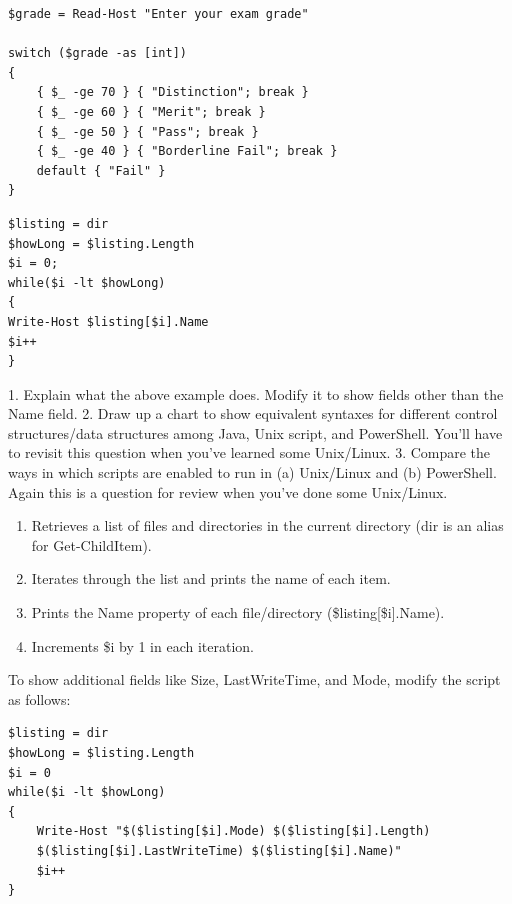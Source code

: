 \documentclass[a4paper]{article}
\begin{document}
\begin{verbatim}
$grade = Read-Host "Enter your exam grade"

switch ($grade -as [int])  
{
    { $_ -ge 70 } { "Distinction"; break }
    { $_ -ge 60 } { "Merit"; break }
    { $_ -ge 50 } { "Pass"; break }
    { $_ -ge 40 } { "Borderline Fail"; break }
    default { "Fail" }
}
\end{verbatim}
\begin{verbatim}
$listing = dir
$howLong = $listing.Length
$i = 0;
while($i -lt $howLong)
{
Write-Host $listing[$i].Name
$i++
}
\end{verbatim}
\textcolor{green!50!black}{
    1. Explain what the above example does. Modify it to show fields other
    than the Name field.
    2. Draw up a chart to show equivalent syntaxes for different control
    structures/data structures among Java, Unix script, and PowerShell. You'll have to
    revisit this question when you've learned some Unix/Linux.
    3. Compare the ways in which scripts are enabled to run in (a)
    Unix/Linux and (b) PowerShell. Again this is a question for review when you've
    done some Unix/Linux.
}
\begin{enumerate}
    \item Retrieves a list of files and directories in the current directory (dir is an alias for Get-ChildItem).
    \item Iterates through the list and prints the name of each item.
    \item Prints the Name property of each file/directory (\$listing[\$i].Name).
    \item Increments \$i by 1 in each iteration.
\end{enumerate}
To show additional fields like Size, LastWriteTime, and Mode, modify the script as follows:
\begin{verbatim}
$listing = dir
$howLong = $listing.Length
$i = 0
while($i -lt $howLong)
{
    Write-Host "$($listing[$i].Mode) $($listing[$i].Length) 
    $($listing[$i].LastWriteTime) $($listing[$i].Name)"
    $i++
}
\end{verbatim}
\small
\end{document}
